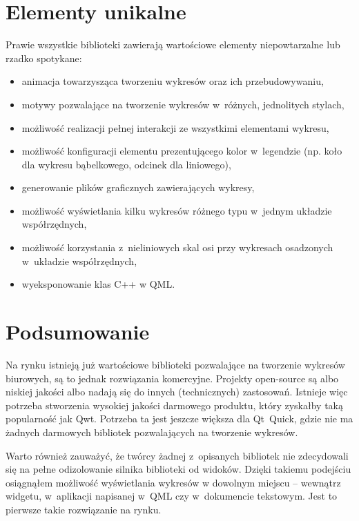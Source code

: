 \section{Elementy unikalne}
Prawie wszystkie biblioteki zawierają wartościowe elementy niepowtarzalne lub rzadko spotykane:
\begin{itemize}
\item{animacja towarzysząca tworzeniu wykresów oraz ich przebudowywaniu,}
\item{motywy pozwalające na tworzenie wykresów w~różnych, jednolitych stylach,}
\item{możliwość realizacji pełnej interakcji ze wszystkimi elementami wykresu,}
\item{możliwość konfiguracji elementu prezentującego kolor w~legendzie (np. koło dla wykresu bąbelkowego, odcinek dla liniowego),}
\item{generowanie plików graficznych zawierających wykresy,}
\item{możliwość wyświetlania kilku wykresów różnego typu w~jednym układzie współrzędnych,}
\item{możliwość korzystania z~nieliniowych skal osi przy wykresach osadzonych w~układzie współrzędnych,}
\item{wyeksponowanie klas C++ w QML.}
\end{itemize}

\section{Podsumowanie}
Na rynku istnieją już wartościowe biblioteki pozwalające na tworzenie wykresów biurowych, są to jednak rozwiązania komercyjne. Projekty open-source są albo niskiej jakości albo nadają się do innych (technicznych) zastosowań. Istnieje więc potrzeba stworzenia wysokiej jakości darmowego produktu, który zyskałby taką popularność jak Qwt. Potrzeba ta jest jeszcze większa dla Qt~Quick, gdzie nie ma żadnych darmowych bibliotek pozwalających na tworzenie wykresów.

Warto również zauważyć, że twórcy żadnej z~opisanych bibliotek nie zdecydowali się na pełne odizolowanie silnika biblioteki od widoków. Dzięki takiemu podejściu osiągnąłem możliwość wyświetlania wykresów w dowolnym miejscu -- wewnątrz widgetu, w~aplikacji napisanej w~QML czy w~dokumencie tekstowym. Jest to pierwsze takie rozwiązanie na rynku.


